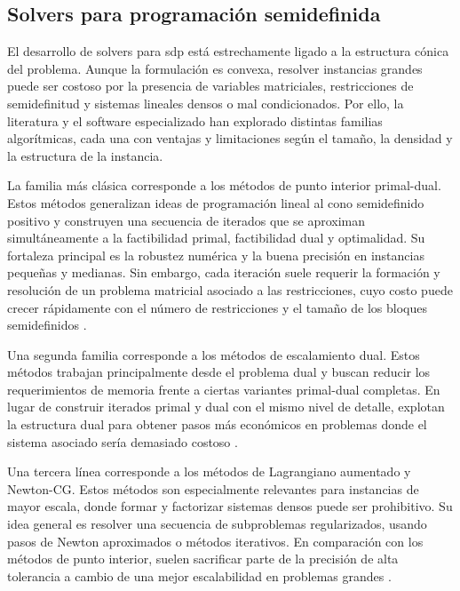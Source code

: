 \newpage
\subsection{Solvers para programación semidefinida}
\label{sec:solvers_sdp}

El desarrollo de solvers para \acrshort{sdp} está estrechamente ligado a la estructura cónica del
problema. Aunque la formulación es convexa, resolver instancias grandes puede ser costoso por
la presencia de variables matriciales, restricciones de semidefinitud y sistemas lineales densos o
mal condicionados. Por ello, la literatura y el software especializado han explorado distintas
familias algorítmicas, cada una con ventajas y limitaciones según el tamaño, la densidad y la
estructura de la instancia.

La familia más clásica corresponde a los métodos de punto interior primal-dual. Estos métodos
generalizan ideas de programación lineal al cono semidefinido positivo y construyen una secuencia
de iterados que se aproximan simultáneamente a la factibilidad primal, factibilidad dual y
optimalidad. Su fortaleza principal es la robustez numérica y la buena precisión en instancias
pequeñas y medianas. Sin embargo, cada iteración suele requerir la formación y resolución de un
problema matricial asociado a las restricciones, cuyo costo puede crecer rápidamente con el número
de restricciones y el tamaño de los bloques semidefinidos
\cite{vandenbergheSemidefiniteProgramming1996}.

Una segunda familia corresponde a los métodos de escalamiento dual. Estos métodos trabajan
principalmente desde el problema dual y buscan reducir los requerimientos de memoria frente a
ciertas variantes primal-dual completas. En lugar de construir iterados primal y dual con el mismo
nivel de detalle, explotan la estructura dual para obtener pasos más económicos en problemas
donde el sistema asociado sería demasiado costoso
\cite{bensonAlgorithm875DSDP5software2008}.

Una tercera línea corresponde a los métodos de Lagrangiano aumentado y Newton-CG. Estos
métodos son especialmente relevantes para instancias de mayor escala, donde formar y factorizar
sistemas densos puede ser prohibitivo. Su idea general es resolver una secuencia de subproblemas
regularizados, usando pasos de Newton aproximados o métodos iterativos. En comparación con
los métodos de punto interior, suelen sacrificar parte de la precisión de alta tolerancia a cambio
de una mejor escalabilidad en problemas grandes
\cite{sunSDPNALMatlabSoftware2019}.

